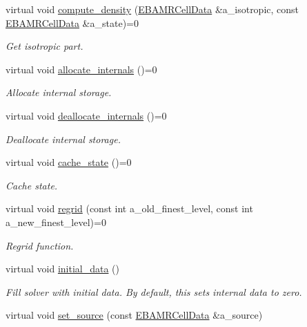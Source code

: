 \begin{DoxyCompactItemize}
virtual void \hyperlink{classrte__solver_abfb550c8b2618bb605c97128c9eab063}{compute\+\_\+density} (\hyperlink{type__definitions_8H_a7e610f301989e5e07781c5e338bdb7c3}{E\+B\+A\+M\+R\+Cell\+Data} \&a\+\_\+isotropic, const \hyperlink{type__definitions_8H_a7e610f301989e5e07781c5e338bdb7c3}{E\+B\+A\+M\+R\+Cell\+Data} \&a\+\_\+state)=0
\begin{DoxyCompactList}\small\item\em Get isotropic part. \end{DoxyCompactList}\item 
virtual void \hyperlink{classrte__solver_ab2f545c1fcc0a9eacf4b4e4293483fa5}{allocate\+\_\+internals} ()=0
\begin{DoxyCompactList}\small\item\em Allocate internal storage. \end{DoxyCompactList}\item 
virtual void \hyperlink{classrte__solver_ade3c59ae1a6d9fcf49babf8bfc8b40d5}{deallocate\+\_\+internals} ()=0
\begin{DoxyCompactList}\small\item\em Deallocate internal storage. \end{DoxyCompactList}\item 
virtual void \hyperlink{classrte__solver_a9cbd338f663f07b4a0d03fa2c7553733}{cache\+\_\+state} ()=0
\begin{DoxyCompactList}\small\item\em Cache state. \end{DoxyCompactList}\item 
virtual void \hyperlink{classrte__solver_a0a821a26bdd992981eb24da414bf94a7}{regrid} (const int a\+\_\+old\+\_\+finest\+\_\+level, const int a\+\_\+new\+\_\+finest\+\_\+level)=0
\begin{DoxyCompactList}\small\item\em Regrid function. \end{DoxyCompactList}\item 
virtual void \hyperlink{classrte__solver_a60e30eb2467f042e9417a2b0a87981f4}{initial\+\_\+data} ()
\begin{DoxyCompactList}\small\item\em Fill solver with initial data. By default, this sets internal data to zero. \end{DoxyCompactList}\item 
virtual void \hyperlink{classrte__solver_a3b3e3140a930015e82b107b1c042a6b3}{set\+\_\+source} (const \hyperlink{type__definitions_8H_a7e610f301989e5e07781c5e338bdb7c3}{E\+B\+A\+M\+R\+Cell\+Data} \&a\+\_\+source)

\end{DoxyCompactItemize}

